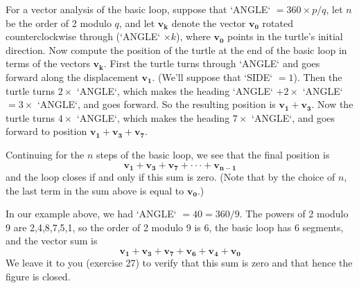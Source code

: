 \documentclass{book}
\begin{document}
For a vector analysis of the basic loop, suppose that \textsc{`ANGLE`} $= 360 \times p/q$, 
let $n$ be the order of 2 modulo $q$, and let $\mathbf{v_k}$ denote the vector
$\mathbf{v_0}$ rotated counterclockwise through (\textsc{`ANGLE`} $\times k$), where $\mathbf{v_0}$ points in the turtle's initial direction. Now compute the position of the turtle at
the end of the basic loop in terms of the vectors $\mathbf{v_k}$. First the turtle
turns through \textsc{`ANGLE`} and goes forward along the displacement $\mathbf{v_1}$. (We'll
suppose that \textsc{`SIDE`} $= 1$). Then the turtle turns $2 \times$ \textsc{`ANGLE`}, which makes
the heading \textsc{`ANGLE`} $+ 2 \times$ \textsc{`ANGLE`} $= 3 \times $ \textsc{`ANGLE`}, and goes forward. So
the resulting position is $\mathbf{v_1} + \mathbf{v_3}$. Now the turtle turns $4 \times$ \textsc{`ANGLE`}, which
makes the heading $7 \times $ \textsc{`ANGLE`}, and goes forward to position $\mathbf{v_1} + \mathbf{v_3} + \mathbf{v_7}$.

Continuing for the $n$ steps of the basic loop, we see that the final position
is $$\mathbf{v_1} + \mathbf{v_3} + \mathbf{v_7} + \cdot \cdot \cdot+\mathbf{v_{n-1}}$$ and the loop closes if and only if this sum is zero. (Note that by the
choice of $n$, the last term in the sum above is equal to $\mathbf{v_0}$.)

In our example above, we had \textsc{`ANGLE`} $= 40 = 360/9$. The powers of
2 modulo 9 are 2,4,8,7,5,1, so the order of 2 modulo 9 is 6, the basic
loop has 6 segments, and the vector sum is
$$\mathbf{v_1} + \mathbf{v_3} + \mathbf{v_7} + \mathbf{v_6} + \mathbf{v_4} + \mathbf{v_0}$$
We leave it to you (exercise 27) to verify that this sum is zero and that
hence the figure is closed.
\end{document}
